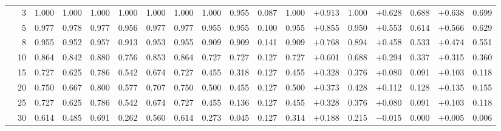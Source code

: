 \documentclass[conference]{IEEEtran}
\theoremstyle{remark}
\begin{document}
\begin{table}[ht]
{\begin{tabular}{p{2.2cm}r rrrr rr rr rr rr rr rr}
\midrule
{}
  & 3  & 1.000 & 1.000 & 1.000 & 1.000 & 1.000 & 1.000 & 1.000 & 0.955 & 0.087 & 1.000 & $+$0.913 & 1.000 & $+$0.628 & 0.688 & $+$0.638 & 0.699 \\
  & 5  & 0.977 & 0.978 & 0.977 & 0.956 & 0.977 & 0.977 & 0.955 & 0.955 & 0.100 & 0.955 & $+$0.855 & 0.950 & $+$0.553 & 0.614 & $+$0.566 & 0.629 \\
  & 8  & 0.955 & 0.952 & 0.957 & 0.913 & 0.953 & 0.955 & 0.909 & 0.909 & 0.141 & 0.909 & $+$0.768 & 0.894 & $+$0.458 & 0.533 & $+$0.474 & 0.551 \\
  & 10 & 0.864 & 0.842 & 0.880 & 0.756 & 0.853 & 0.864 & 0.727 & 0.727 & 0.127 & 0.727 & $+$0.601 & 0.688 & $+$0.294 & 0.337 & $+$0.315 & 0.360 \\
  & 15 & 0.727 & 0.625 & 0.786 & 0.542 & 0.674 & 0.727 & 0.455 & 0.318 & 0.127 & 0.455 & $+$0.328 & 0.376 & $+$0.080 & 0.091 & $+$0.103 & 0.118 \\
  & 20 & 0.750 & 0.667 & 0.800 & 0.577 & 0.707 & 0.750 & 0.500 & 0.455 & 0.127 & 0.500 & $+$0.373 & 0.428 & $+$0.112 & 0.128 & $+$0.135 & 0.155 \\
  & 25 & 0.727 & 0.625 & 0.786 & 0.542 & 0.674 & 0.727 & 0.455 & 0.136 & 0.127 & 0.455 & $+$0.328 & 0.376 & $+$0.080 & 0.091 & $+$0.103 & 0.118 \\
  & 30 & 0.614 & 0.485 & 0.691 & 0.262 & 0.560 & 0.614 & 0.273 & 0.045 & 0.127 & 0.314 & $+$0.188 & 0.215 & $-$0.015 & 0.000 & $+$0.005 & 0.006 \\

\end{tabular}}
\end{table}
\end{document}
